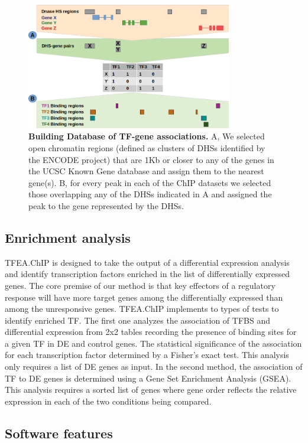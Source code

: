 \documentclass[10pt,letterpaper]{article}
\begin{document}
 \begin{figure}[h]
 	\centering
 	\includegraphics[width=0.8\textwidth]{fig2_LPO}
 	\caption{{\bf Building Database of TF-gene associations.} A, We selected open chromatin regions (defined as clusters of DHSs identified by the ENCODE project) that are 1Kb or closer to any of the genes in the UCSC Known Gene database and assign them to the nearest gene(s). B, for every peak in each of the ChIP datasets we selected those overlapping any of the DHSs indicated in A and assigned the peak to the gene represented by the DHSs.}
 	\label{fig1}
 \end{figure}

\subsection*{Enrichment analysis}
 TFEA.ChIP is designed to take the output of a differential expression analysis and identify transcription factors enriched in the list of differentially expressed genes. The core premise of our method is that key effectors of a regulatory response will have more target genes among the differentially expressed than among the unresponsive genes. TFEA.ChIP implements to types of tests to identify enriched TF. The first one analyzes the association of TFBS and differential expression from 2x2 tables recording the presence of binding sites for a given TF in DE and control genes. The statistical significance of the association for each transcription factor determined by a Fisher’s exact test. This analysis only requires a list of DE genes as input. In the second method, the association of TF to DE genes is determined using a Gene Set Enrichment Analysis (GSEA)\cite{GSEA1}. This analysis requires a sorted list of genes where gene order reflects the relative expression in each of the two conditions being compared.
 
 \subsection*{Software features}
  
\end{document}
